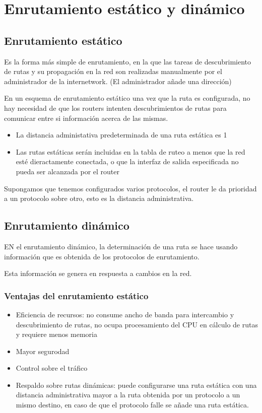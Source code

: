 \chapter{Enrutamiento estático y dinámico}

\section{Enrutamiento estático}
Es la forma más simple de enrutamiento, en la que las tareas de descubrimiento de rutas y su propagación en la red son realizadas manualmente por el administrador de la internetwork. (El administrador añade una dirección)

En un esquema de enrutamiento estático una vez que la ruta es configurada, no hay necesidad de que los routers intenten descubrimientos de rutas para comunicar entre si información acerca de las mismas.
\begin{itemize}
    \item {La distancia administativa predeterminada de una ruta estática es 1}
    \item {Las rutas estáticas serán incluidas en la tabla de ruteo a menos que la red esté dieractamente conectada, o que la interfaz de salida especificada no pueda ser alcanzada por el router}
\end{itemize}

Supongamos que tenemos configurados varios protocolos, el router le da prioridad a un protocolo sobre otro, esto es la distancia administrativa.

\section{Enrutamiento dinámico}
EN el enrutamiento dinámico, la determinación de una ruta se hace usando información que es obtenida de los protocolos de enrutamiento.

Esta información se genera en respuesta a cambios en la red.

\subsection{Ventajas del enrutamiento estático}
\begin{itemize}
    \item {Eficiencia de recursos: no consume ancho de banda para intercambio y descubrimiento de rutas, no ocupa procesamiento del CPU en cálculo de rutas y requiere menos memoria}
    \item {Mayor segurodad}
    \item {Control sobre el tráfico}
    \item {Respaldo sobre rutas dinámicas: puede configurarse una ruta estática con una distancia administrativa mayor a la ruta obtenida por un protocolo a un mismo destino, en caso de que el protocolo falle se añade una ruta estática.}
\end{itemize}

